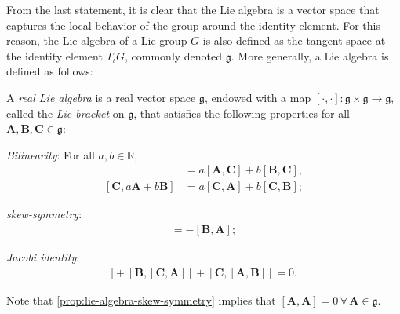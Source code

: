 From the last statement, it is clear that the Lie algebra is a vector space that captures the local behavior of the group around the identity element. For this reason, the Lie algebra of a Lie group $G$ is also defined as the tangent space at the identity element $T_\iota G$, commonly denoted $\mathfrak{g}$. More generally, a Lie algebra is defined as follows:
\begin{definition}
    A \emph{real Lie algebra} is a real vector space $\mathfrak{g}$, endowed with a map $[\cdot, \cdot]:\mathfrak{g}\times\mathfrak{g}\to\mathfrak{g}$, called the \emph{Lie bracket} on $\mathfrak{g}$, that satisfies the following properties for all $\mathbf{A},\mathbf{B},\mathbf{C}\in\mathfrak{g}$:
    \begin{property}
        \item \emph{Bilinearity}: For all $a,b\in\mathbb{R}$,
        \begin{align*}
            [a\mathbf{A}+b\mathbf{B}, \mathbf{C}] &= a[\mathbf{A}, \mathbf{C}] + b[\mathbf{B}, \mathbf{C}], \\
             [\mathbf{C}, a\mathbf{A}+b\mathbf{B}] &= a[\mathbf{C}, \mathbf{A}] + b[\mathbf{C}, \mathbf{B}];
        \end{align*}
        \item \emph{skew-symmetry}: 
        \begin{align*}
            [\mathbf{A}, \mathbf{B}] = -[\mathbf{B}, \mathbf{A}];
        \end{align*} \label{prop:lie-algebra-skew-symmetry}
        \item \emph{Jacobi identity}:
        \begin{align*}
            [\mathbf{A}, [\mathbf{B}, \mathbf{C}]] + [\mathbf{B}, [\mathbf{C}, \mathbf{A}]] + [\mathbf{C}, [\mathbf{A}, \mathbf{B}]] = 0.
        \end{align*}
    \end{property}
\end{definition}
Note that \cref{prop:lie-algebra-skew-symmetry} implies that $[\mathbf{A}, \mathbf{A}]=0\,\forall\,\mathbf{A}\in\mathfrak{g}$. 

